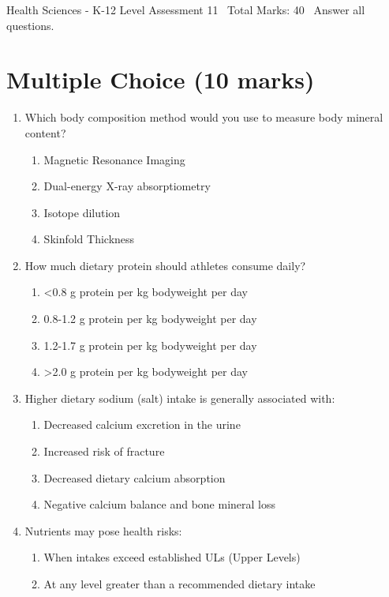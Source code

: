\documentclass[12pt]{article}
\begin{document}
\begin{center}
Health Sciences - K-12 Level Assessment 11 \
Total Marks: 40 \
Answer all questions.
\end{center}

\section*{Multiple Choice (10 marks)}
\begin{enumerate}[label=\arabic*.]
\item Which body composition method would you use to measure body mineral content?
\begin{enumerate}[label=(\alph*)]
    \item Magnetic Resonance Imaging
    \item Dual-energy X-ray absorptiometry
    \item Isotope dilution
    \item Skinfold Thickness
\end{enumerate}
\item How much dietary protein should athletes consume daily?
\begin{enumerate}[label=(\alph*)]
    \item \textless{}0.8 g protein per kg bodyweight per day
    \item 0.8-1.2 g protein per kg bodyweight per day
    \item 1.2-1.7 g protein per kg bodyweight per day
    \item \textgreater{}2.0 g protein per kg bodyweight per day
\end{enumerate}
\item Higher dietary sodium (salt) intake is generally associated with:
\begin{enumerate}[label=(\alph*)]
    \item Decreased calcium excretion in the urine
    \item Increased risk of fracture
    \item Decreased dietary calcium absorption
    \item Negative calcium balance and bone mineral loss
\end{enumerate}
\item Nutrients may pose health risks:
\begin{enumerate}[label=(\alph*)]
    \item When intakes exceed established ULs (Upper Levels)
    \item At any level greater than a recommended dietary intake

\end{enumerate}
\end{enumerate}
\end{document}
